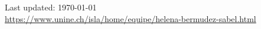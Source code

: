 \documentclass[11pt, a4paper]{article}
\begin{document}
\vfill{}

\begin{center}
{\scriptsize  Last updated: \today\- %
\\
\href{https://www.unine.ch/isla/home/equipe/helena-bermudez-sabel.html}{https://www.unine.ch/isla/home/equipe/helena-bermudez-sabel.html}
}
\end{center}
\end{document}
